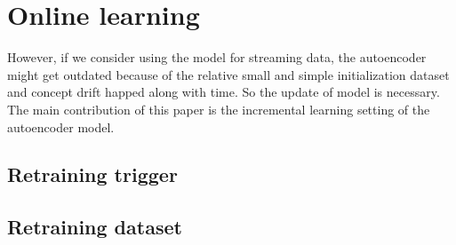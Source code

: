 \section{Online learning}
\label{sec:Onlinelearning}
However, if we consider using the model for streaming data, the autoencoder might get outdated because of the relative small and simple initialization dataset and concept drift happed along with time. So the update of model is necessary. The main contribution of this paper is the incremental learning setting of the autoencoder model.

\subsection{Retraining trigger}
\label{trigger}

\subsection{Retraining dataset}
\label{data}


